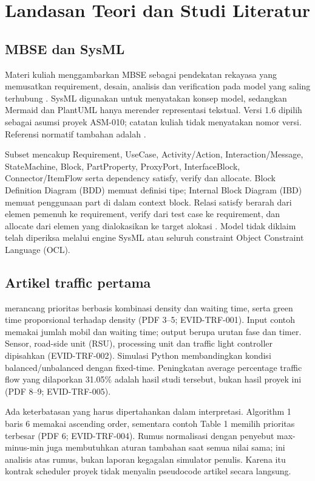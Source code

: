 \chapter{Landasan Teori dan Studi Literatur}
\section{MBSE dan SysML}
Materi kuliah menggambarkan MBSE sebagai pendekatan rekayasa yang memusatkan requirement, desain, analisis dan verification pada model yang saling terhubung \parencite[bagian 3 dan 10]{lecture01}. SysML digunakan untuk menyatakan konsep model, sedangkan Mermaid dan PlantUML hanya merender representasi tekstual. Versi 1.6 dipilih sebagai asumsi proyek ASM-010; catatan kuliah tidak menyatakan nomor versi. Referensi normatif tambahan adalah \textcite{omg2019}.

Subset mencakup Requirement, UseCase, Activity/Action, Interaction/Message, StateMachine, Block, PartProperty, ProxyPort, InterfaceBlock, Connector/ItemFlow serta dependency satisfy, verify dan allocate. Block Definition Diagram (BDD) memuat definisi tipe; Internal Block Diagram (IBD) memuat penggunaan part di dalam context block. Relasi satisfy berarah dari elemen pemenuh ke requirement, verify dari test case ke requirement, dan allocate dari elemen yang dialokasikan ke target alokasi \parencite[bagian 15.3.1.2, 16.3.2.7, 16.3.2.9]{omg2019}. Model tidak diklaim telah diperiksa melalui engine SysML atau seluruh constraint Object Constraint Language (OCL).

\section{Artikel traffic pertama}
\textcite{mondal2022} merancang prioritas berbasis kombinasi density dan waiting time, serta green time proporsional terhadap density (PDF 3--5; EVID-TRF-001). Input contoh memakai jumlah mobil dan waiting time; output berupa urutan fase dan timer. Sensor, road-side unit (RSU), processing unit dan traffic light controller dipisahkan (EVID-TRF-002). Simulasi Python membandingkan kondisi balanced/unbalanced dengan fixed-time. Peningkatan average percentage traffic flow yang dilaporkan 31.05\% adalah hasil studi tersebut, bukan hasil proyek ini (PDF 8--9; EVID-TRF-005).

Ada keterbatasan yang harus dipertahankan dalam interpretasi. Algorithm 1 baris 6 memakai ascending order, sementara contoh Table 1 memilih prioritas terbesar (PDF 6; EVID-TRF-004). Rumus normalisasi dengan penyebut max-minus-min juga membutuhkan aturan tambahan saat semua nilai sama; ini analisis atas rumus, bukan laporan kegagalan simulator penulis. Karena itu kontrak scheduler proyek tidak menyalin pseudocode artikel secara langsung.

